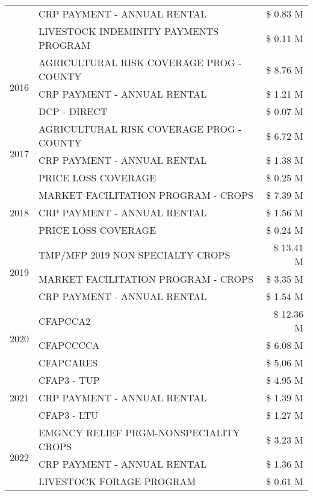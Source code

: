 \begin{tabular}{llr}
 & CRP PAYMENT - ANNUAL RENTAL & \$ 0.83 M \\
 & LIVESTOCK INDEMINITY PAYMENTS PROGRAM & \$ 0.11 M \\
\cline{1-3}
\multirow[t]{3}{*}{2016} & AGRICULTURAL RISK COVERAGE PROG - COUNTY & \$ 8.76 M \\
 & CRP PAYMENT - ANNUAL RENTAL & \$ 1.21 M \\
 & DCP - DIRECT & \$ 0.07 M \\
\cline{1-3}
\multirow[t]{3}{*}{2017} & AGRICULTURAL RISK COVERAGE PROG - COUNTY & \$ 6.72 M \\
 & CRP PAYMENT - ANNUAL RENTAL & \$ 1.38 M \\
 & PRICE LOSS COVERAGE & \$ 0.25 M \\
\cline{1-3}
\multirow[t]{3}{*}{2018} & MARKET FACILITATION PROGRAM - CROPS & \$ 7.39 M \\
 & CRP PAYMENT - ANNUAL RENTAL & \$ 1.56 M \\
 & PRICE LOSS COVERAGE & \$ 0.24 M \\
\cline{1-3}
\multirow[t]{3}{*}{2019} & TMP/MFP 2019 NON SPECIALTY CROPS & \$ 13.41 M \\
 & MARKET FACILITATION PROGRAM - CROPS & \$ 3.35 M \\
 & CRP PAYMENT - ANNUAL RENTAL & \$ 1.54 M \\
\cline{1-3}
\multirow[t]{3}{*}{2020} & CFAPCCA2 & \$ 12.36 M \\
 & CFAPCCCCA & \$ 6.08 M \\
 & CFAPCARES & \$ 5.06 M \\
\cline{1-3}
\multirow[t]{3}{*}{2021} & CFAP3 - TUP & \$ 4.95 M \\
 & CRP PAYMENT - ANNUAL RENTAL & \$ 1.39 M \\
 & CFAP3 - LTU & \$ 1.27 M \\
\cline{1-3}
\multirow[t]{3}{*}{2022} & EMGNCY RELIEF PRGM-NONSPECIALITY CROPS & \$ 3.23 M \\
 & CRP PAYMENT - ANNUAL RENTAL & \$ 1.36 M \\
 & LIVESTOCK FORAGE PROGRAM & \$ 0.61 M \\
\cline{1-3}
\bottomrule
\end{tabular}
